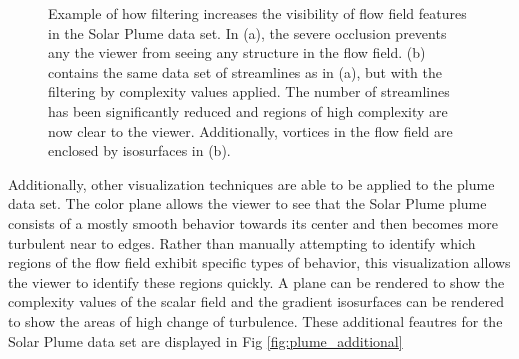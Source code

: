 \documentclass[journal]{vgtc}                %
\begin{document}
\begin{figure}[t]
\begin{minipage}{0.47\linewidth}
		\end{minipage}
	\caption{Example of how filtering increases the visibility of flow field features in the Solar Plume data set. In (a), the severe occlusion prevents any the viewer from seeing any structure in the flow field. (b) contains the same data set of streamlines as in (a), but with the filtering by complexity values applied. The number of streamlines has been significantly reduced and regions of high complexity are now clear to the viewer. Additionally, vortices in the flow field are enclosed by isosurfaces in (b).}
	\label{fig:plume_lines}
\end{figure}

Additionally, other visualization techniques are able to be applied to the plume data set.
The color plane allows the viewer to see that the Solar Plume plume consists of a mostly smooth behavior towards its center and then becomes more turbulent near to edges.
Rather than manually attempting to identify which regions of the flow field exhibit specific types of behavior, this visualization allows the viewer to identify these regions quickly.
A plane can be rendered to show the complexity values of the scalar field and the gradient isosurfaces can be rendered to show the areas of high change of turbulence.
These additional feautres for the Solar Plume data set are displayed in Fig \ref{fig:plume_additional}
\end{document}

